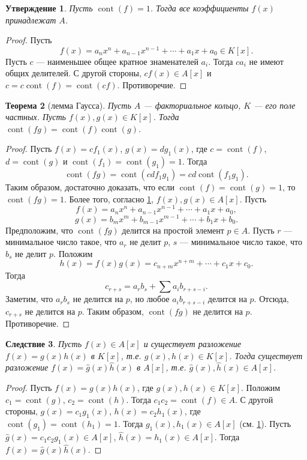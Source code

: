 \documentclass[12pt, titlepage, oneside]{amsbook}
\newcommand{\cont}{\operatorname{cont}}
\newtheorem{theorem}{Теорема}[chapter]
\newtheorem{corollary}[theorem]{Следствие}
\newtheorem{claim}[theorem]{Утверждение}
\theoremstyle{definition}
\theoremstyle{remark}
\begin{document}
\begin{claim}
	\label{Mn2-4}
	Пусть $\cont(f)=1$. Тогда все коэффициенты $f(x)$ принадлежат $A$.
\end{claim}

\begin{proof}
	Пусть $$f(x)=a_nx^n+a_{n-1}x^{n-1}+\cdots+a_1x+a_0\in K[x].$$ Пусть $c$ --- наименьшее общее кратное знаменателей $a_i$. Тогда $ca_i$ не имеют общих делителей. С другой стороны, $cf(x)\in A[x]$ и $c=c\cont(f)=\cont(cf)$. Противоречие.
\end{proof}

\begin{theorem}[лемма Гаусса]
	\label{Gaus2}
	Пусть $A$ --- факториальное кольцо, $K$ --- его поле частных.
	Пусть $f(x),g(x)\in K[x]$. Тогда $\cont(fg)=\cont(f)\cont(g)$.
\end{theorem}

\begin{proof}
	Пусть $f(x)=cf_1(x)$, $g(x)=dg_1(x)$, где $c=\cont(f)$, $d=\cont(g)$ и $\cont(f_1)=\cont(g_1)=1$. Тогда $$\cont(fg)=\cont(cdf_1g_1)=cd\cont(f_1g_1).$$ Таким образом, достаточно доказать, что если $\cont(f)=\cont(g)=1$, то $\cont(fg)=1$. Более того, согласно \ref{Mn2-4}, $f(x),g(x)\in A[x]$. Пусть $$f(x)=a_nx^n+a_{n-1}x^{n-1}+\cdots+a_1x+a_0,$$ $$g(x)=b_mx^m+b_{m-1}x^{m-1}+\cdots+b_1x+b_0.$$ Предположим, что $\cont(fg)$ делится на простой элемент $p\in A$. Пусть $r$ --- минимальное число такое, что $a_r$ не делит $p$, $s$ --- минимальное число такое, что $b_s$ не делит $p$. Положим $$h(x)=f(x)g(x)=c_{n+m}x^{n+m}+\cdots+c_1x+c_0.$$ Тогда $$c_{r+s}=a_rb_s+\sum a_ib_{r+s-i}.$$ Заметим, что $a_rb_s$ не делится на $p$, но любое $a_ib_{r+s-i}$ делится на $p$. Отсюда, $c_{r+s}$ не делится на $p$. Таким образом, $\cont(fg)$ не делится на $p$. Противоречие.
\end{proof}

\begin{corollary}
	\label{Mn2-5}
	Пусть $f(x)\in A[x]$ и существует разложение $f(x)=g(x)h(x)$ в $K[x]$, т.е. $g(x),h(x)\in K[x]$. Тогда существует разложение $f(x)=\hat{g}(x)\hat{h}(x)$ в $A[x]$, т.е. $\hat{g}(x),\hat{h}(x)\in A[x]$.
\end{corollary}

\begin{proof}
	Пусть $f(x)=g(x)h(x)$, где $g(x),h(x)\in K[x]$. Положим $c_1=\cont(g)$, $c_2=\cont(h)$. Тогда $c_1c_2=\cont(f)\in A$. С другой стороны, $g(x)=c_1g_1(x)$, $h(x)=c_2h_1(x)$, где $\cont(g_1)=\cont(h_1)=1$. Тогда $g_1(x),h_1(x)\in A[x]$ (см. \ref{Mn2-4}). Пусть $\hat{g}(x)=c_1c_2g_1(x)\in A[x]$, $\hat{h}(x)=h_1(x)\in A[x]$. Тогда $f(x)=\hat{g}(x)\hat{h}(x)$.
\end{proof}
\end{document}
